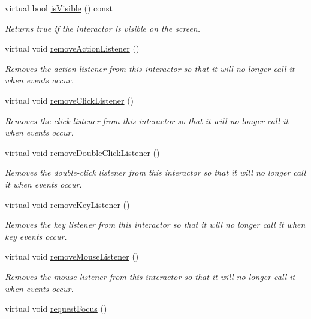 \begin{DoxyCompactItemize}
virtual bool \mbox{\hyperlink{classGInteractor_a9d8a6cfb13917785c143e74d40e4e2be}{is\+Visible}} () const
\begin{DoxyCompactList}\small\item\em Returns true if the interactor is visible on the screen. \end{DoxyCompactList}\item 
virtual void \mbox{\hyperlink{classGInteractor_ab7fe7a876367b87cf7202f947f1d05e4}{remove\+Action\+Listener}} ()
\begin{DoxyCompactList}\small\item\em Removes the action listener from this interactor so that it will no longer call it when events occur. \end{DoxyCompactList}\item 
virtual void \mbox{\hyperlink{classGInteractor_ad39d0325cde6b97ebda4b9d7787c633b}{remove\+Click\+Listener}} ()
\begin{DoxyCompactList}\small\item\em Removes the click listener from this interactor so that it will no longer call it when events occur. \end{DoxyCompactList}\item 
virtual void \mbox{\hyperlink{classGInteractor_aa4250907e4cdd77349c04f0cf5cdd3d3}{remove\+Double\+Click\+Listener}} ()
\begin{DoxyCompactList}\small\item\em Removes the double-\/click listener from this interactor so that it will no longer call it when events occur. \end{DoxyCompactList}\item 
virtual void \mbox{\hyperlink{classGInteractor_a43095f41cab3be732b49f29970484b05}{remove\+Key\+Listener}} ()
\begin{DoxyCompactList}\small\item\em Removes the key listener from this interactor so that it will no longer call it when key events occur. \end{DoxyCompactList}\item 
virtual void \mbox{\hyperlink{classGInteractor_aff47f71ce47e688a07c9d38dc92fcc11}{remove\+Mouse\+Listener}} ()
\begin{DoxyCompactList}\small\item\em Removes the mouse listener from this interactor so that it will no longer call it when events occur. \end{DoxyCompactList}\item 
virtual void \mbox{\hyperlink{classGInteractor_a519fb2ac767f8b2febbb50b898b8c8cb}{request\+Focus}} ()

\end{DoxyCompactItemize}
